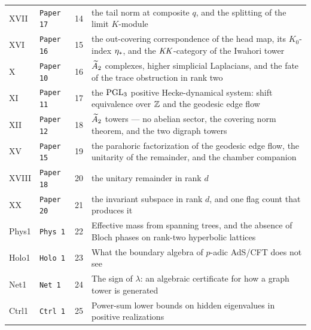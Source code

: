 \begin{longtable}{llr>{\raggedright\arraybackslash}p{8.2cm}}
XVII & \texttt{Paper 17} & 14 & the tail norm at composite $q$, and the splitting of the limit $K$-module\\
XVI & \texttt{Paper 16} & 15 & the out-covering correspondence of the head map, its $K_0$-index $\eta_*$, and the
$\mathit{KK}$-category of the Iwahori tower\\
X & \texttt{Paper 10} & 16 & $\widetilde A_2$ complexes, higher simplicial Laplacians, and the fate of the trace obstruction in
rank two\\
XI & \texttt{Paper 11} & 17 & the $\mathrm{PGL}_3$ positive Hecke-dynamical system: shift equivalence over $\mathbb{Z}$ and the geodesic
edge flow\\
XII & \texttt{Paper 12} & 18 & $\widetilde A_2$ towers --- no abelian sector, the covering norm theorem, and the two digraph towers\\
XV & \texttt{Paper 15} & 19 & the parahoric factorization of the geodesic edge flow, the unitarity of the remainder,
and the chamber companion\\
XVIII & \texttt{Paper 18} & 20 & the unitary remainder in rank $d$\\
XX & \texttt{Paper 20} & 21 & the invariant subspace in rank $d$, and one flag count that produces it\\
Phys1 & \texttt{Phys 1} & 22 & Effective mass from spanning trees, and the absence of Bloch phases on rank-two hyperbolic lattices\\
Holo1 & \texttt{Holo 1} & 23 & What the boundary algebra of $p$-adic AdS/CFT does not see\\
Net1 & \texttt{Net 1} & 24 & The sign of $\lambda$: an algebraic certificate for how a graph tower is generated\\
Ctrl1 & \texttt{Ctrl 1} & 25 & Power-sum lower bounds on hidden eigenvalues in positive realizations\\
\bottomrule
\end{longtable}
